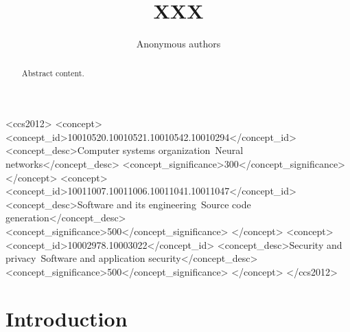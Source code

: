 \documentclass[sigconf]{acmart}
\begin{document}
\title{XXX}

\author{Anonymous authors}
 \email{}
\renewcommand{\shortauthors}{Anonymous Author, et al.}

\begin{abstract}

Abstract content.

\end{abstract}

\begin{CCSXML}
<ccs2012>
    <concept>
        <concept_id>10010520.10010521.10010542.10010294</concept_id>
        <concept_desc>Computer systems organization~Neural networks</concept_desc>
        <concept_significance>300</concept_significance>
    </concept>
    <concept>
        <concept_id>10011007.10011006.10011041.10011047</concept_id>
        <concept_desc>Software and its engineering~Source code generation</concept_desc>
        <concept_significance>500</concept_significance>
    </concept>
    <concept>
        <concept_id>10002978.10003022</concept_id>
        <concept_desc>Security and privacy~Software and application security</concept_desc>
        <concept_significance>500</concept_significance>
    </concept>
</ccs2012>
\end{CCSXML}
    


\maketitle

\section{Introduction} \label{introduction}
\end{document}
